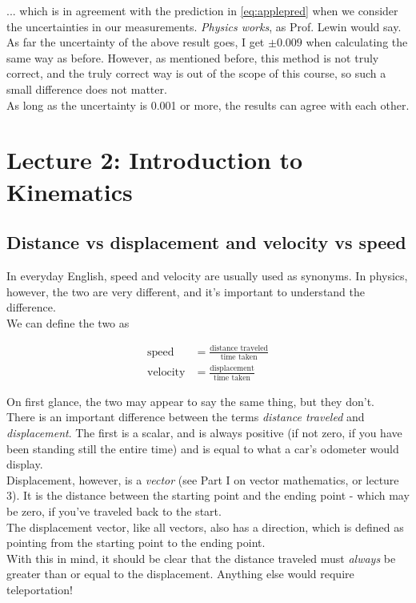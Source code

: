 ... which is in agreement with the prediction in \eqref{eq:applepred} when we consider the uncertainties in our measurements. \emph{Physics works}, as Prof. Lewin would say.\\
As far the uncertainty of the above result goes, I get $\pm 0.009$ when calculating the same way as before. However, as mentioned before, this method is not truly correct, and the truly correct way is out of the scope of this course, so such a small difference does not matter.\\
As long as the uncertainty is 0.001 or more, the results can agree with each other.

\section{Lecture 2: Introduction to Kinematics}

\subsection{Distance vs displacement and velocity vs speed}

In everyday English, speed and velocity are usually used as synonyms. In physics, however, the two are very different, and it's important to understand the difference.\\
We can define the two as

\begin{align}
 \text{speed} &= \frac{\text{distance traveled}}{\text{time taken}}\\
 \text{velocity} &= \frac{\text{displacement}}{\text{time taken}}
\end{align}

On first glance, the two may appear to say the same thing, but they don't.\\
There is an important difference between the terms \emph{distance traveled} and \emph{displacement}. The first is a scalar, and is always positive (if not zero, if you have been standing still the entire time) and is equal to what a car's odometer would display.\\
Displacement, however, is a \emph{vector} (see Part I on vector mathematics, or lecture 3). It is the distance between the starting point and the ending point - which may be zero, if you've traveled back to the start.\\
The displacement vector, like all vectors, also has a direction, which is defined as pointing from the starting point to the ending point.\\
With this in mind, it should be clear that the distance traveled must \emph{always} be greater than or equal to the displacement. Anything else would require teleportation!

